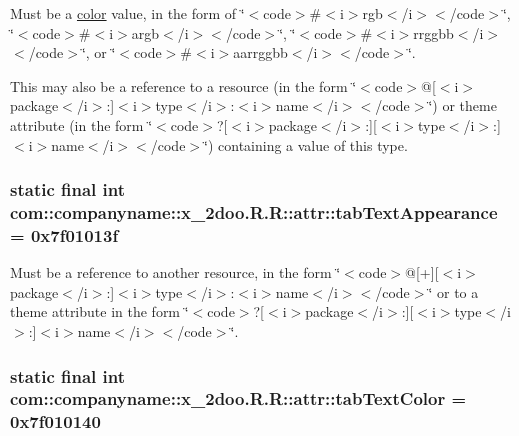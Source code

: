Must be a \hyperlink{classcom_1_1companyname_1_1x__2doo_1_1_r_1_1color}{color} value, in the form of \char`\"{}$<$code$>$\#$<$i$>$rgb$<$/i$>$$<$/code$>$\char`\"{}, \char`\"{}$<$code$>$\#$<$i$>$argb$<$/i$>$$<$/code$>$\char`\"{}, \char`\"{}$<$code$>$\#$<$i$>$rrggbb$<$/i$>$$<$/code$>$\char`\"{}, or \char`\"{}$<$code$>$\#$<$i$>$aarrggbb$<$/i$>$$<$/code$>$\char`\"{}. 

This may also be a reference to a resource (in the form \char`\"{}$<$code$>$@\mbox{[}$<$i$>$package$<$/i$>$:\mbox{]}$<$i$>$type$<$/i$>$:$<$i$>$name$<$/i$>$$<$/code$>$\char`\"{}) or theme attribute (in the form \char`\"{}$<$code$>$?\mbox{[}$<$i$>$package$<$/i$>$:\mbox{]}\mbox{[}$<$i$>$type$<$/i$>$:\mbox{]}$<$i$>$name$<$/i$>$$<$/code$>$\char`\"{}) containing a value of this type. \hypertarget{classcom_1_1companyname_1_1x__2doo_1_1_r_1_1attr_8804b231b3750c9c41c4354b36fb325c}{
\subsubsection[{tabTextAppearance}]{\setlength{\rightskip}{0pt plus 5cm}static final int com::companyname::x\_\-2doo.R.R::attr::tabTextAppearance = 0x7f01013f}}
\label{classcom_1_1companyname_1_1x__2doo_1_1_r_1_1attr_8804b231b3750c9c41c4354b36fb325c}


Must be a reference to another resource, in the form \char`\"{}$<$code$>$@\mbox{[}+\mbox{]}\mbox{[}$<$i$>$package$<$/i$>$:\mbox{]}$<$i$>$type$<$/i$>$:$<$i$>$name$<$/i$>$$<$/code$>$\char`\"{} or to a theme attribute in the form \char`\"{}$<$code$>$?\mbox{[}$<$i$>$package$<$/i$>$:\mbox{]}\mbox{[}$<$i$>$type$<$/i$>$:\mbox{]}$<$i$>$name$<$/i$>$$<$/code$>$\char`\"{}. \hypertarget{classcom_1_1companyname_1_1x__2doo_1_1_r_1_1attr_19a3682daf015e5ae97ede6684865c2b}{
\subsubsection[{tabTextColor}]{\setlength{\rightskip}{0pt plus 5cm}static final int com::companyname::x\_\-2doo.R.R::attr::tabTextColor = 0x7f010140}}
\label{classcom_1_1companyname_1_1x__2doo_1_1_r_1_1attr_19a3682daf015e5ae97ede6684865c2b}


